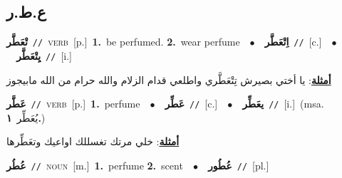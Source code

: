 \documentclass[10pt,a4paper,twoside]{article} %
\begin{document}
\begin{multicols}{2}
\vspace{-3mm}
\subsection*{\color{blue}\foreignlanguage{arabic}{ع.ط.ر}\color{blue}{}} 

{\setlength\topsep{0pt}\textbf{\foreignlanguage{arabic}{تْعَطَّر}}\ {\color{gray}\texttt{//}\color{black}}\ \textsc{verb}\ [p.]\ \textbf{1.}~be perfumed.  \textbf{2.}~wear perfume\ \ $\bullet$\ \ \setlength\topsep{0pt}\textbf{\foreignlanguage{arabic}{اِتْعَطَّر}}\ {\color{gray}\texttt{//}\color{black}}\ [c.]\ \ $\bullet$\ \ \setlength\topsep{0pt}\textbf{\foreignlanguage{arabic}{يِتْعَطَّر}}\ {\color{gray}\texttt{//}\color{black}}\ [i.]\  \begin{flushright}\color{gray}\foreignlanguage{arabic}{\textbf{\underline{\foreignlanguage{arabic}{أمثلة}}}: يا أختي بصيرش تِتْعَطَّري واطلعي قدام الزلام والله حرام من الله مابيجوز}\end{flushright}\color{black}} \vspace{2mm}

{\setlength\topsep{0pt}\textbf{\foreignlanguage{arabic}{عَطَّر}}\ {\color{gray}\texttt{//}\color{black}}\ \textsc{verb}\ [p.]\ \textbf{1.}~perfume\ \ $\bullet$\ \ \setlength\topsep{0pt}\textbf{\foreignlanguage{arabic}{عَطِّر}}\ {\color{gray}\texttt{//}\color{black}}\ [c.]\ \ $\bullet$\ \ \setlength\topsep{0pt}\textbf{\foreignlanguage{arabic}{يعَطِّر}}\ {\color{gray}\texttt{//}\color{black}}\ [i.]\ \color{gray}(msa. \foreignlanguage{arabic}{يُعَطِّر}~\foreignlanguage{arabic}{\textbf{١.}})\color{black}\  \begin{flushright}\color{gray}\foreignlanguage{arabic}{\textbf{\underline{\foreignlanguage{arabic}{أمثلة}}}: خلي مرتك تغسللك اواعيك وتعَطِّرها}\end{flushright}\color{black}} \vspace{2mm}

{\setlength\topsep{0pt}\textbf{\foreignlanguage{arabic}{عُطُر}}\ {\color{gray}\texttt{//}\color{black}}\ \textsc{noun}\ [m.]\ \textbf{1.}~perfume  \textbf{2.}~scent\ \ $\bullet$\ \ \setlength\topsep{0pt}\textbf{\foreignlanguage{arabic}{عُطُور}}\ {\color{gray}\texttt{//}\color{black}}\ [pl.]\ } \vspace{2mm}


\end{multicols}
\end{document}
